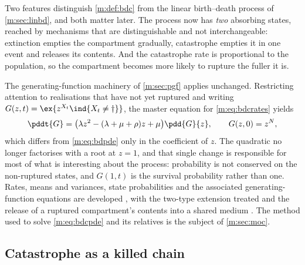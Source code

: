 Two features distinguish \cref{m:def:bdc} from the linear birth--death process of
\cref{m:sec:linbd}, and both matter later. The process now has \emph{two} absorbing
states, reached by mechanisms that are distinguishable and not interchangeable:
extinction empties the compartment gradually, catastrophe empties it in one event
and releases its contents. And the catastrophe rate is proportional to the
population, so the compartment becomes more likely to rupture the fuller it is.

The generating-function machinery of \cref{m:sec:pgf} applies unchanged. Restricting
attention to realisations that have not yet ruptured and writing
$G(z,t) = \ex{z^{X_t}\ind\{X_t\neq\dagger\}}$, the master equation for
\cref{m:eq:bdcrates} yields
\begin{equation}
\label{m:eq:bdcpde}
\pddt{G} = \bigl(\lambda z^2-(\lambda+\mu+\rho)z+\mu\bigr)\pdd{G}{z},
\qquad G(z,0) = z^{N},
\end{equation}
which differs from \cref{m:eq:bdpde} only in the coefficient of $z$. The quadratic no
longer factorises with a root at $z=1$, and that single change is responsible for
most of what is interesting about the process: probability is not conserved on the
non-ruptured states, and $G(1,t)$ is the survival probability rather than one.
Rates, means and variances, state probabilities and the associated
generating-function equations are developed , with the two-type extension treated
 and the release of a
ruptured compartment's contents into a shared medium
. The method used to solve
\cref{m:eq:bdcpde} and its relatives is the subject of \cref{m:sec:moc}.

\subsection{Catastrophe as a killed chain}
\label{m:sec:killedchain}

